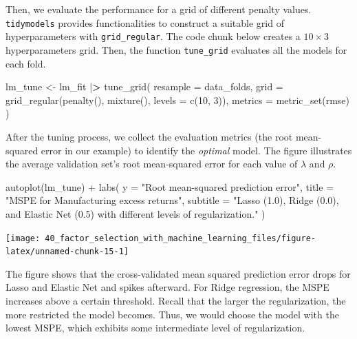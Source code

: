 \documentclass[
]{book}
\newenvironment{Shaded}{\begin{snugshade}}{\end{snugshade}}
\newcommand{\AttributeTok}[1]{\textcolor[rgb]{0.61,0.61,0.61}{#1}}
\newcommand{\DecValTok}[1]{\textcolor[rgb]{0.06,0.06,0.06}{#1}}
\newcommand{\ErrorTok}[1]{\textcolor[rgb]{0.14,0.14,0.14}{\textbf{#1}}}
\newcommand{\FunctionTok}[1]{\textcolor[rgb]{0,0,0}{#1}}
\newcommand{\NormalTok}[1]{#1}
\newcommand{\OtherTok}[1]{\textcolor[rgb]{0.37,0.37,0.37}{#1}}
\newcommand{\SpecialCharTok}[1]{\textcolor[rgb]{0,0,0}{#1}}
\newcommand{\StringTok}[1]{\textcolor[rgb]{0.5,0.5,0.5}{#1}}
\begin{document}
Then, we evaluate the performance for a grid of different penalty values. \texttt{tidymodels} provides functionalities to construct a suitable grid of hyperparameters with \texttt{grid\_regular}. The code chunk below creates a \(10 \times 3\) hyperparameters grid. Then, the function \texttt{tune\_grid} evaluates all the models for each fold.

\begin{Shaded}
\begin{Highlighting}[]
\NormalTok{lm\_tune }\OtherTok{\textless{}{-}}\NormalTok{ lm\_fit }\SpecialCharTok{|}\ErrorTok{\textgreater{}}
  \FunctionTok{tune\_grid}\NormalTok{(}
    \AttributeTok{resample =}\NormalTok{ data\_folds,}
    \AttributeTok{grid =} \FunctionTok{grid\_regular}\NormalTok{(}\FunctionTok{penalty}\NormalTok{(), }\FunctionTok{mixture}\NormalTok{(), }\AttributeTok{levels =} \FunctionTok{c}\NormalTok{(}\DecValTok{10}\NormalTok{, }\DecValTok{3}\NormalTok{)),}
    \AttributeTok{metrics =} \FunctionTok{metric\_set}\NormalTok{(rmse)}
\NormalTok{  )}
\end{Highlighting}
\end{Shaded}

After the tuning process, we collect the evaluation metrics (the root mean-squared error in our example) to identify the \emph{optimal} model. The figure illustrates the average validation set's root mean-squared error for each value of \(\lambda\) and \(\rho\).

\begin{Shaded}
\begin{Highlighting}[]
\FunctionTok{autoplot}\NormalTok{(lm\_tune) }\SpecialCharTok{+}
  \FunctionTok{labs}\NormalTok{(}
    \AttributeTok{y =} \StringTok{"Root mean{-}squared prediction error"}\NormalTok{,}
    \AttributeTok{title =} \StringTok{"MSPE for Manufacturing excess returns"}\NormalTok{,}
    \AttributeTok{subtitle =} \StringTok{"Lasso (1.0), Ridge (0.0), and Elastic Net (0.5) with different levels of regularization."}
\NormalTok{  )}
\end{Highlighting}
\end{Shaded}

\begin{center}\texttt{[image: 40\_factor\_selection\_with\_machine\_learning\_files/figure-latex/unnamed-chunk-15-1]} \end{center}

The figure shows that the cross-validated mean squared prediction error drops for Lasso and Elastic Net and spikes afterward. For Ridge regression, the MSPE increases above a certain threshold. Recall that the larger the regularization, the more restricted the model becomes. Thus, we would choose the model with the lowest MSPE, which exhibits some intermediate level of regularization.
\end{document}
